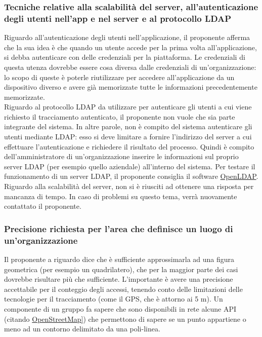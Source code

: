 \subsubsection*{Tecniche relative alla scalabilità del server, all'autenticazione degli utenti nell'app e nel server e al protocollo LDAP}
Riguardo all'autenticazione degli utenti nell'applicazione, il proponente afferma che la sua idea è che quando un utente accede per la prima volta all'applicazione, si debba autenticare con delle credenziali per la piattaforma.
Le credenziali di questa utenza dovrebbe essere cosa diversa dalle credenziali di un'organizzazione: lo scopo di queste è poterle riutilizzare per accedere all'applicazione da un dispositivo diverso e avere già
memorizzate tutte le informazioni precedentemente memorizzate.\\
Riguardo al protocollo LDAP da utilizzare per autenticare gli utenti a cui viene richiesto il tracciamento autenticato, il proponente non vuole che sia parte integrante del sistema.
In altre parole, non è compito del sistema autenticare gli utenti mediante LDAP: esso si deve limitare a fornire l'indirizzo del server a cui effettuare l'autenticazione e richiedere il risultato del processo.
Quindi è compito dell'amministratore di un'organizzazione inserire le informazioni sul proprio server LDAP (per esempio quello aziendale) all'interno del sistema.
Per testare il funzionamento di un server LDAP, il proponente consiglia il software \href{https://www.openldap.org/}{OpenLDAP}.\\
Riguardo alla scalabilità del server, non si è riusciti ad ottenere una risposta per mancanza di tempo. In caso di problemi su questo tema, verrà nuovamente contattato il proponente.

\subsubsection*{Precisione richiesta per l'area che definisce un luogo di un'organizzazione}
Il proponente a riguardo dice che è sufficiente approssimarla ad una figura geometrica (per esempio un quadrilatero), che per la maggior parte dei casi dovrebbe risultare più che sufficiente.
L'importante è avere una precisione accettabile per il conteggio degli accessi, tenendo conto delle limitazioni delle tecnologie per il tracciamento (come il GPS, che è attorno ai 5 m).
Un componente di un gruppo fa sapere che sono disponibili in rete alcune API (citando \href{https://www.openstreetmap.org/}{OpenStreetMap]}) che permettono di sapere se un punto appartiene o meno ad un contorno delimitato da una poli-linea.

